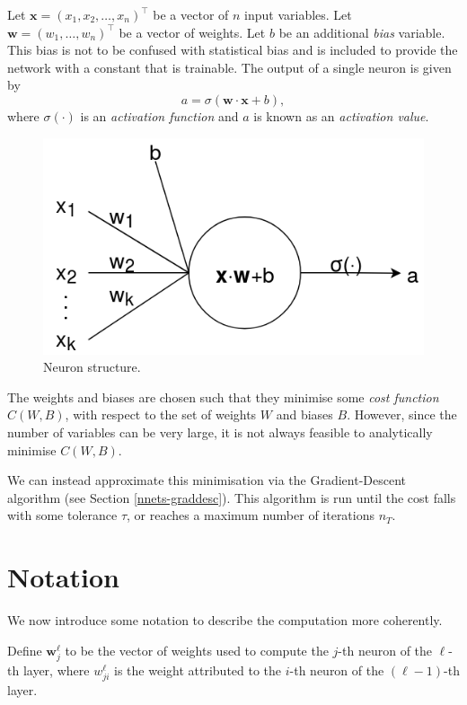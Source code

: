 Let $\mathbf{x} = (x_1, x_2, \ldots, x_n)^\intercal$ be a vector of $n$ input variables. Let $\mathbf{w} = (w_1, \ldots, w_n)^\intercal$ be a vector of weights. Let $b$ be an additional \textit{bias} variable. This bias is not to be confused with statistical bias and is included to provide the network with a constant that is trainable. The output of a single neuron is given by
\[
	a = \sigma(\mathbf{w}\cdot\mathbf{x} + b),
\]
where $\sigma(\cdot)$ is an \textit{activation function} and $a$ is known as an \textit{activation value}.

\begin{figure}[ht]
	\centering
	\includegraphics[scale=0.5]{Images/3_neuron.png}
	\caption{Neuron structure.}
	\label{nnet-neuronfig}
\end{figure}

The weights and biases are chosen such that they minimise some \textit{cost function} $C(W,B)$, with respect to the set of weights $W$ and biases $B$. However, since the number of variables can be very large, it is not always feasible to analytically minimise $C(W,B)$.

We can instead approximate this minimisation via the Gradient-Descent algorithm (see Section \ref{nnets-graddesc}). This algorithm is run until the cost falls with some tolerance $\tau$, or reaches a maximum number of iterations $n_T$.

\section{Notation}\label{nnets-not}

We now introduce some notation to describe the computation more coherently.

Define $\mathbf{w}^\ell_j$ to be the vector of weights used to compute the $j$-th neuron of the $\ell$-th layer, where $w_{ji}^\ell$ is the weight attributed to the $i$-th neuron of the $(\ell-1)$-th layer.

